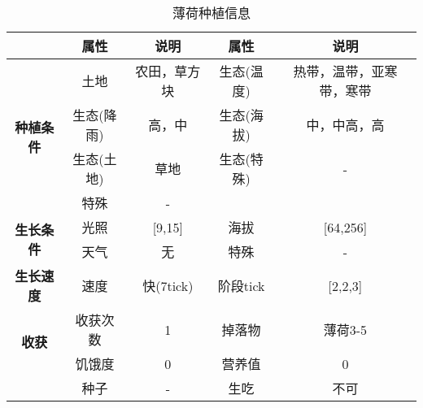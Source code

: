 \begin{table}[H]
    \centering
    \caption{薄荷种植信息}
    \label{table:薄荷种植信息}
    \setlength{\tabcolsep}{4mm}
    \begin{tabular}{c|cc|cc}
        \toprule
                                           & \textbf{属性} & \textbf{说明} & \textbf{属性} & \textbf{说明}    \\
        \midrule
        \multirow{4}{*}{\textbf{种植条件}} & 土地         & 农田，草方块  &   生态(温度)   & 热带，温带，亚寒带，寒带\\
                                           & 生态(降雨)    & 高，中            & 生态(海拔)    & 中，中高，高         \\
                                           & 生态(土地)    & 草地          & 生态(特殊)    & -                \\
                                           & 特殊          & -                                                \\
        \midrule
        \multirow{2}{*}{\textbf{生长条件}} & 光照          & [9,15]        & 海拔          & [64,256]         \\
                                           & 天气          & 无            & 特殊          & -                \\
        \midrule
        \textbf{生长速度}                  & 速度          & 快(7tick)  & 阶段tick      & [2,2,3]          \\
        \midrule
        \multirow{2}{*}{\textbf{收获}}     & 收获次数      & 1             & 掉落物        & 薄荷3-5 \\
                                           & 饥饿度        & 0             & 营养值        & 0                \\
                                           & 种子          & -  & 生吃          & 不可       \\
        \bottomrule
    \end{tabular}
\end{table}

\newpage